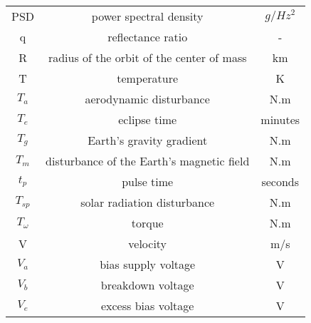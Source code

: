 \begin{center}
\begin{longtable}{c|c|c}
PSD                             		& power spectral density                       														& $g/{Hz^2}$ \\

q                               		& reflectance ratio                              													& - \\

R																		& radius of the orbit of the center of mass 															& km \\

T 																	& temperature 																														& K \\

$T_a$                             	& aerodynamic disturbance                         												& N.m \\

$T_e$                              	& eclipse time                             																& minutes \\

$T_g$                         			& Earth's gravity gradient                        												& N.m \\

$T_m$                         			& disturbance of the Earth's magnetic field     													& N.m \\

$t_p$                          			& pulse time                         																			& seconds \\

$T_{sp}$                        		& solar radiation disturbance                 														& N.m \\

$T_{\omega}$                       	& torque                                 																	& N.m \\

V																		& velocity																																& m/s \\

$V_a$ 															& bias supply voltage 																										& V \\

$V_b$ 															& breakdown voltage																												& V \\

$V_e$ 															& excess bias voltage																											& V \\


\end{longtable}
\end{center}
